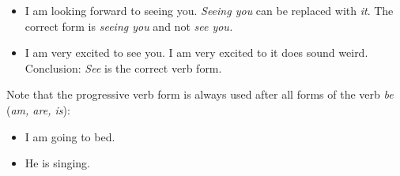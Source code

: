 \documentclass{article}
\begin{document}
\begin{itemize}
    \item I am looking forward to seeing you. 
     \newline \textit{Seeing you} can be replaced with \textit{it}. The correct form is \textit{seeing you} and not \textit{see you.}
    \item I am very excited to see you.
    \newline I am very excited to it does sound weird. Conclusion: \textit{See} is the correct verb form.
\end{itemize}

Note that the progressive verb form is always used after all forms of the verb \textit{be} (\textit{am, are, is}):

\begin{itemize}
    \item I am going to bed.
    \item He is singing.
\end{itemize}




\end{document}
